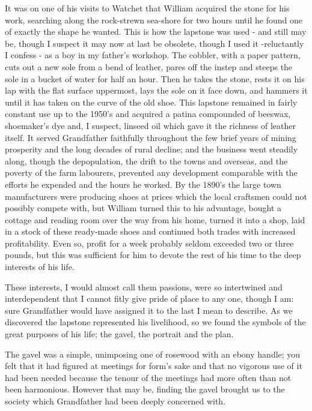 It was on one of his visits to Watchet that William acquired the stone for his work, searching along the rock-strewn sea-shore for two hours until he found one of exactly the shape he wanted. This is how the lapstone was used - and still may be, though I suspect it may now at last be obsolete, though I used it -reluctantly I confess - as a boy in my father's workshop. The cobbler, with a paper pattern, cuts out a new sole from a bend of leather, pares off the instep and steeps the sole in a bucket of water for half an hour. Then he takes the stone, rests it on his lap with the flat surface uppermost, lays the sole on it face down, and hammers it until it has taken on the curve of the old shoe. This lapstone remained in fairly constant use up to the 1950's and acquired a patina compounded of beeswax, shoemaker's dye and, I suspect, linseed oil which gave it the richness of leather itself. It served Grandfather faithfully throughout the few brief years of mining prosperity and the long decades of rural decline; and the business went steadily along, though the depopulation, the drift to the towns and overseas, and the poverty of the farm labourers, prevented any development comparable with the efforts he expended and the hours he worked. By the 1890's the large town manufacturers were producing shoes at prices which the local craftsmen could not possibly compete with, but William turned this to his advantage, bought a cottage and reading room over the way from his home, turned it into a shop, laid in a stock of these ready-made shoes and continued both trades with increased profitability. Even so, profit for a week probably seldom exceeded two or three pounds, but this was sufficient for him to devote the rest of his time to the deep interests of his life.

These interests, I would almost call them passions, were so intertwined and interdependent that I cannot fitly give pride of place to any one, though I am: sure Grandfather would have assigned it to the last I mean to describe. As we discovered the lapstone represented his livelihood, so we found the symbols of the great purposes of his life; the gavel, the portrait and the plan.

The gavel was a simple, unimposing one of rosewood with an ebony handle; you felt that it had figured at meetings for form's sake and that no vigorous use of it had been needed because the tenour of the meetings had more often than not been harmonious. However that may be, finding the gavel brought us to the society which Grandfather had been deeply concerned with.

